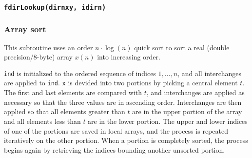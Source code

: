 
\begin{usessubs}
\end{usessubs}

\subsubsection{\texttt{fdirLookup(dirnxy, idirn)}}


\subsubsection{Array sort}


This subroutine uses an order $n\cdot\log(n)$ quick sort to sort
a real (double precision/8-byte) array $x(n)$ into increasing order.


\texttt{ind} is initialized to the ordered sequence of indices $1,\ldots,n$,
and all interchanges are applied to \texttt{ind}. \texttt{x} is devided
into two portions by picking a central element $t$. The first and
last elements are compared with $t$, and interchanges are applied
as necessary so that the three values are in ascending order. Interchanges
are then applied so that all elements greater than $t$ are in the
upper portion of the array and all elements less than $t$ are in
the lower portion. The upper and lower indices of one of the portions
are saved in local arrays, and the process is repeated iteratively
on the other portion. When a portion is completely sorted, the process
begins again by retrieving the indices bounding another unsorted portion.

